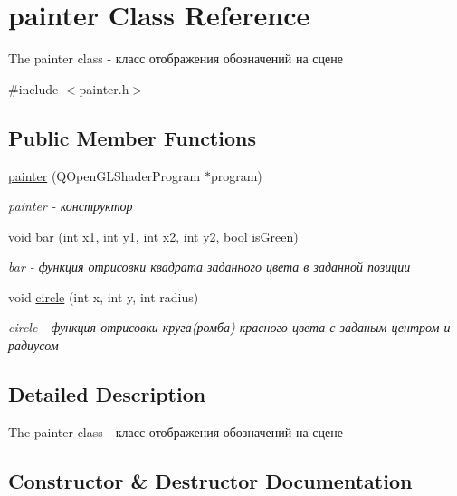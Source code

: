 \hypertarget{classpainter}{}\section{painter Class Reference}
\label{classpainter}


The painter class -\/ класс отображения обозначений на сцене  




{\ttfamily \#include $<$painter.\+h$>$}

\subsection*{Public Member Functions}
\begin{DoxyCompactItemize}
\item 
\hyperlink{classpainter_ad2449966024bf01eaca7e51dbe811ee8}{painter} (Q\+Open\+G\+L\+Shader\+Program $\ast$program)
\begin{DoxyCompactList}\small\item\em painter -\/ конструктор \end{DoxyCompactList}\item 
void \hyperlink{classpainter_a9032c525a037d38fd675b18b03cd2edb}{bar} (int x1, int y1, int x2, int y2, bool is\+Green)
\begin{DoxyCompactList}\small\item\em bar -\/ функция отрисовки квадрата заданного цвета в заданной позиции \end{DoxyCompactList}\item 
void \hyperlink{classpainter_a2f0e1b6f2820c941de240d91f0a83de7}{circle} (int x, int y, int radius)
\begin{DoxyCompactList}\small\item\em circle -\/ функция отрисовки круга(ромба) красного цвета с заданым центром и радиусом \end{DoxyCompactList}\end{DoxyCompactItemize}


\subsection{Detailed Description}
The painter class -\/ класс отображения обозначений на сцене 

\subsection{Constructor \& Destructor Documentation}
\hypertarget{classpainter_ad2449966024bf01eaca7e51dbe811ee8}{}
